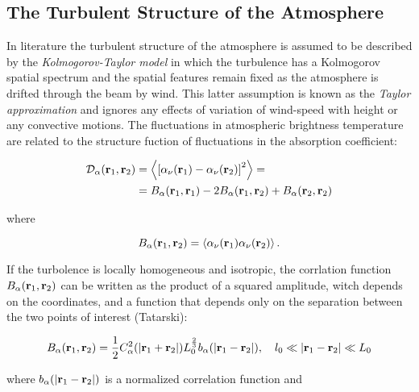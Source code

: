 \subsection{The Turbulent Structure of the Atmosphere}\label{ss:turbulent_structure}

In literature the turbulent structure of the atmosphere is assumed to be
described by the \emph{Kolmogorov-Taylor model} in which the turbulence has
a Kolmogorov spatial spectrum and the spatial features remain fixed as the
atmosphere is drifted through the beam by wind. This latter assumption is
known as the \emph{Taylor approximation} and ignores any effects of
variation of wind-speed with height or any convective motions.
The fluctuations in atmospheric brightness temperature are related to the
structure fuction of fluctuations in the absorption coefficient:

\begin{equation}
        \begin{split}
                \mathcal{D}_\alpha\qty(\vb{r}_1,\vb{r}_2) & =
                \expval{\qty[\alpha_\nu\qty(\vb{r}_1) -
                \alpha_\nu\qty(\vb{r}_2)]^2} =
                \\
                & = B_\alpha\qty(\vb{r}_1,\vb{r}_1) -
                2B_\alpha\qty(\vb{r}_1,\vb{r}_2) + B_\alpha\qty(\vb{r}_2,\vb{r}_2)
        \end{split}
\end{equation}

where

\begin{equation}
        B_\alpha\qty(\vb{r}_1,\vb{r}_2) =
        \expval{\alpha_\nu\qty(\vb{r}_1)\alpha_\nu\qty(\vb{r}_2)}.
\end{equation}

If the turbolence is locally homogeneous and isotropic, the corrlation
function $B_\alpha\qty(\vb{r}_1,\vb{r}_2)$ can be written as the product of
a squared amplitude, witch depends on the coordinates, and a function that
depends only on the separation between the two points of interest (Tatarski):

\begin{equation}
        B_\alpha\qty(\vb{r}_1,\vb{r}_2) = \frac{1}{2}
        C^2_\alpha\qty(\abs{\vb{r}_1 + \vb{r}_2})
        L^{\frac{2}{3}}_0 b_\alpha\qty(\abs{\vb{r}_1 - \vb{r}_2}),\quad
        l_0 \ll \abs{\vb{r}_1 - \vb{r}_2} \ll L_0
\end{equation}

where $b_\alpha\qty(\abs{\vb{r}_1 - \vb{r}_2})$ is a normalized correlation
function and

